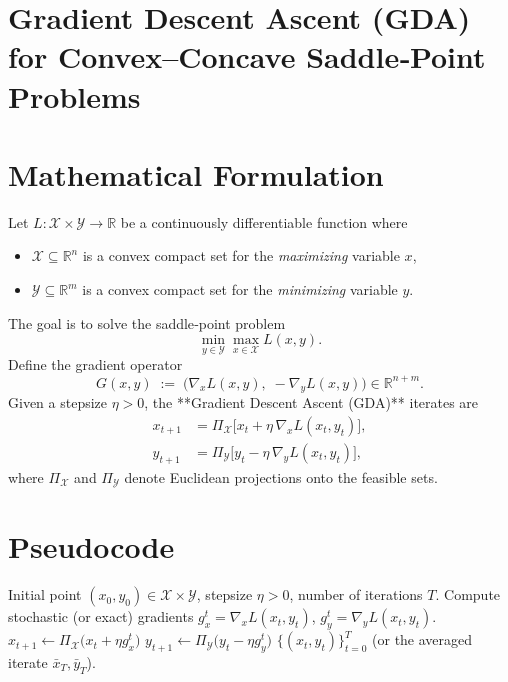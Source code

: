 \documentclass{article}
\newcommand{\R}{\mathbb{R}}
\begin{document}
\section*{Gradient Descent Ascent (GDA) for Convex--Concave Saddle‑Point Problems}

\section*{Mathematical Formulation}
Let $L:\mathcal{X}\times\mathcal{Y}\rightarrow\R$ be a continuously differentiable function where
\begin{itemize}
  \item $\mathcal{X}\subseteq\R^{n}$ is a convex compact set for the \emph{maximizing} variable $x$,
  \item $\mathcal{Y}\subseteq\R^{m}$ is a convex compact set for the \emph{minimizing} variable $y$.
\end{itemize}
The goal is to solve the saddle‑point problem
\[
\min_{y\in\mathcal{Y}}\max_{x\in\mathcal{X}} L(x,y).
\]
Define the gradient operator
\[
G(x,y)\;:=\;\bigl(\nabla_{x}L(x,y),\;-\nabla_{y}L(x,y)\bigr)\in\R^{n+m}.
\]
Given a stepsize $\eta>0$, the **Gradient Descent Ascent (GDA)** iterates are
\begin{align}
x_{t+1} &= \Pi_{\mathcal{X}}\!\bigl[x_{t} + \eta\,\nabla_{x}L(x_{t},y_{t})\bigr], \label{eq:update-x}\\
y_{t+1} &= \Pi_{\mathcal{Y}}\!\bigl[y_{t} - \eta\,\nabla_{y}L(x_{t},y_{t})\bigr], \label{eq:update-y}
\end{align}
where $\Pi_{\mathcal{X}}$ and $\Pi_{\mathcal{Y}}$ denote Euclidean projections onto the feasible sets.

\section*{Pseudocode}
\begin{algorithm}[H]
\caption{Gradient Descent Ascent (GDA)}\label{alg:gda}
\begin{algorithmic}[1]
\Require Initial point $(x_{0},y_{0})\in\mathcal{X}\times\mathcal{Y}$, stepsize $\eta>0$, number of iterations $T$.
    \State Compute stochastic (or exact) gradients $g_{x}^{t}= \nabla_{x}L(x_{t},y_{t})$, $g_{y}^{t}= \nabla_{y}L(x_{t},y_{t})$.
    \State $x_{t+1}\gets \Pi_{\mathcal{X}}\!\bigl(x_{t}+\eta g_{x}^{t}\bigr)$ 
    \State $y_{t+1}\gets \Pi_{\mathcal{Y}}\!\bigl(y_{t}-\eta g_{y}^{t}\bigr)$ 
\EndFor
\State \Return $\{(x_{t},y_{t})\}_{t=0}^{T}$ (or the averaged iterate $\bar{x}_{T},\bar{y}_{T}$).
\end{algorithmic}
\end{algorithm}
\end{document}
